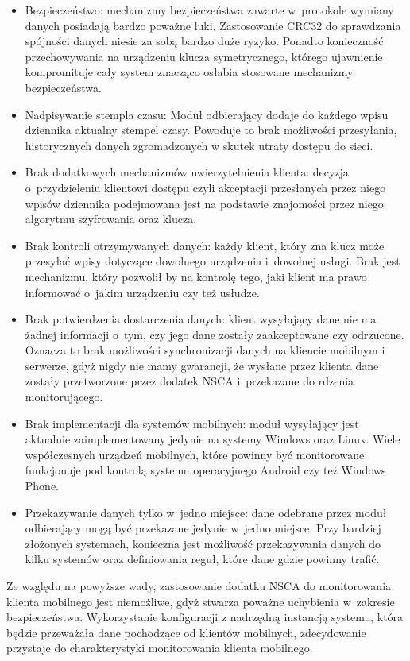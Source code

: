 \begin{itemize}
\item Bezpieczeństwo: mechanizmy bezpieczeństwa zawarte w~protokole
  wymiany danych posiadają bardzo poważne luki. Zastosowanie CRC32 do
  sprawdzania spójności danych niesie za sobą bardzo duże
  ryzyko. Ponadto konieczność przechowywania na urządzeniu klucza
  symetrycznego, którego ujawnienie kompromituje cały system znacząco osłabia
  stosowane mechanizmy bezpieczeństwa.
\item Nadpisywanie stempla czasu: Moduł odbierający dodaje do każdego
  wpisu dziennika aktualny stempel czasy. Powoduje to brak możliwości
  przesyłania, historycznych danych zgromadzonych w skutek utraty
  dostępu do sieci.
\item Brak dodatkowych mechanizmów uwierzytelnienia klienta: decyzja
  o~przydzieleniu klientowi dostępu czyli akceptacji przesłanych przez
  niego wpisów dziennika podejmowana jest na podstawie znajomości
  przez niego algorytmu szyfrowania oraz klucza.
\item Brak kontroli otrzymywanych danych: każdy klient, który zna
  klucz może przesyłać wpisy dotyczące dowolnego urządzenia i~dowolnej
  usługi. Brak jest mechanizmu, który pozwolił by na kontrolę tego,
  jaki klient ma prawo informować o~jakim urządzeniu czy też usłudze.
\item Brak potwierdzenia dostarczenia danych: klient wysyłający dane
  nie ma żadnej informacji o~tym, czy jego dane zostały zaakceptowane
  czy odrzucone. Oznacza to brak możliwości synchronizacji danych na
  kliencie mobilnym i serwerze, gdyż nigdy nie mamy gwarancji, że
  wysłane przez klienta dane zostały przetworzone przez dodatek NSCA
  i~przekazane do rdzenia monitorującego.
\item Brak implementacji dla systemów mobilnych: moduł wysyłający jest
  aktualnie zaimplementowany jedynie na systemy Windows oraz
  Linux. Wiele współczesnych urządzeń mobilnych, które powinny być
  monitorowane funkcjonuje pod kontrolą systemu operacyjnego Android
  czy też Windows Phone.
\item Przekazywanie danych tylko w~jedno miejsce: dane odebrane przez
  moduł odbierający mogą być przekazane jedynie w~jedno miejsce. Przy
  bardziej złożonych systemach, konieczna jest możliwość przekazywania
  danych do kilku systemów oraz definiowania reguł, które dane gdzie
  powinny trafić.
\end{itemize}

Ze względu na powyższe wady, zastosowanie dodatku NSCA do
monitorowania klienta mobilnego jest niemożliwe, gdyż stwarza poważne
uchybienia w~zakresie bezpieczeństwa. Wykorzystanie konfiguracji z
nadrzędną instancją systemu, która będzie przeważała dane pochodzące
od klientów mobilnych, zdecydowanie przystaje do charakterystyki
monitorowania klienta mobilnego.
